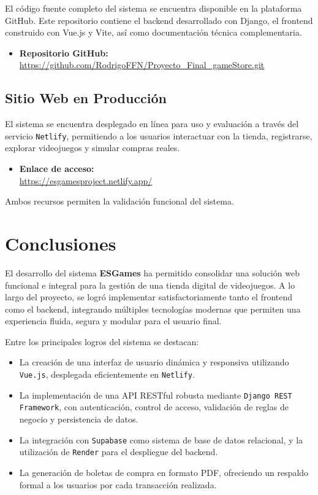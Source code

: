 \documentclass{article}
\begin{document}
El código fuente completo del sistema se encuentra disponible en la plataforma GitHub. Este repositorio contiene el backend desarrollado con Django, el frontend construido con Vue.js y Vite, así como documentación técnica complementaria.

\begin{itemize}
    \item \textbf{Repositorio GitHub:} \\
    \url{https://github.com/RodrigoFFN/Proyecto_Final_gameStore.git}
\end{itemize}

\subsection{Sitio Web en Producción}

El sistema se encuentra desplegado en línea para uso y evaluación a través del servicio \texttt{Netlify}, permitiendo a los usuarios interactuar con la tienda, registrarse, explorar videojuegos y simular compras reales.

\begin{itemize}
    \item \textbf{Enlace de acceso:} \\
    \url{https://esgamesproject.netlify.app/}
\end{itemize}

Ambos recursos permiten la validación funcional del sistema.
\section{Conclusiones}

El desarrollo del sistema \textbf{ESGames} ha permitido consolidar una solución web funcional e integral para la gestión de una tienda digital de videojuegos. A lo largo del proyecto, se logró implementar satisfactoriamente tanto el frontend como el backend, integrando múltiples tecnologías modernas que permiten una experiencia fluida, segura y modular para el usuario final.

Entre los principales logros del sistema se destacan:

\begin{itemize}
    \item La creación de una interfaz de usuario dinámica y responsiva utilizando \texttt{Vue.js}, desplegada eficientemente en \texttt{Netlify}.
    \item La implementación de una API RESTful robusta mediante \texttt{Django REST Framework}, con autenticación, control de acceso, validación de reglas de negocio y persistencia de datos.
    \item La integración con \texttt{Supabase} como sistema de base de datos relacional, y la utilización de \texttt{Render} para el despliegue del backend.
    \item La generación de boletas de compra en formato PDF, ofreciendo un respaldo formal a los usuarios por cada transacción realizada.
\end{itemize}
\end{document}
